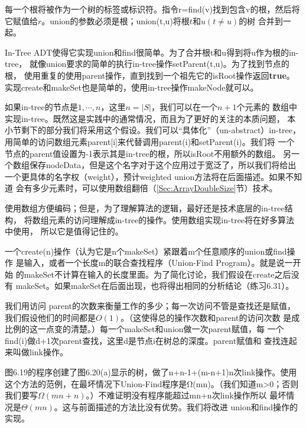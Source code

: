 每一个根将被作为一个树的标签或标识符。指令r=find(v)找到包含v的根，然后将
它赋值给$r$。union的参数必须是根；union(t,u)将根$t$和$u(t \neq u)$的树
合并到一起。

In-Tree ADT使得它实现union和find很简单。为了合并根t和u得到将u作为根的in-tree，
就像union要求的简单的执行in-tree操作setParent(t,u)。为了找到节点的根，
使用重复的使用parent操作，直到找到一个祖先它的isRoot操作返回{\textbf{true}}。
实现create和makeSet也是简单的，使用in-tree操作makeNode就可以。

如果in-tree的节点是$1, \cdots, n$，这里$n=|S|$，我们可以在一个$n+1$个元素的
数组中实现in-tree。既然这是实践中的通常情况，而且为了更好的关注的本质问题，
本小节剩下的部分我们将采用这个假设。我们可以“具体化”（un-abstract）in-tree，
用简单的访问数组元素parent[i]来代替调用parent(i)和setParent(i)。我们将
一个节点的parent值设置为-1表示其是in-tree的根，所以isRoot不用额外的数组。
另一个数组保存nodeData，但是这个名字对于这个应用过于宽泛了，所以我们将给出
一个更具体的名字权（weight），预计weighted union方法将在后面描述。如果不知道
会有多少元素时，可以使用数组翻倍（\ref{Sec:ArrayDoubleSize}节）技术。

使用数组方便编码；但是，为了理解算法的逻辑，最好还是技术底层的in-tree结构，
将数组元素的访问理解成in-tree的操作。使用数组实现in-tree将在好多算法中使用，
所以它是值得记住的。

一个create(n)操作（认为它是n个makeSet）紧跟着m个任意顺序的union或find操作
是输入，或者一个长度m的联合查找程序（Union-Find Program）。就是说一开始
的makeSet不计算在输入的长度里面。为了简化讨论，我们假设在create之后没有
makeSet。如果makeSet在后面出现，也将得出相同的分析结论（练习6.31）。

我们用访问 parent的次数来衡量工作的多少；每一次访问不管是查找还是赋值，
我们假设他们的时间都是$O(1)$。（这使得总的操作次数和parent的访问次数
是成比例的这一点变的清楚。）每一个makeSet和union做一次parent赋值，每
一个find(i)做d+1次parent查找，这里d是节点i在树总的深度。parent赋值和
查找连起来叫做link操作。

图6.19的程序创建了图6.20(a)显示的树，做了n+n-1+(m-n+1)n次link操作。使用
这个方法的范例，在最坏情况下Union-Find程序是Ω(mn)。（我们知道m>0；否则
我们要写$\Omega(mn+n)$。）不难证明没有程序能超过mn+n次link操作所以
最坏情况是$\Theta(mn)$。这与前面描述的方法比没有优势。我们将改进
union和find操作的实现。

